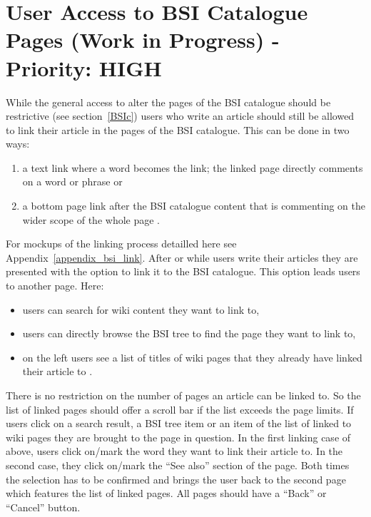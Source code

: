 \section{User Access to BSI Catalogue Pages (Work in Progress) - Priority: HIGH}
\label{2nd_bsi_link}
While the general access to alter the pages of the BSI catalogue should be restrictive (see section~\ref{BSIc}) users who write an article should still be allowed to link their article in the pages of the BSI catalogue.
This can be done in two ways:
\begin{enumerate}
    \item a text link where a word becomes the link; the linked page directly comments on a word or phrase or
    \item a bottom page link after the BSI catalogue content that is commenting on the wider scope of the whole page
        .
\end{enumerate}
\begin{tcolorbox}[breakable,colback=red!12,colframe=red!40!black,title=UPDATE 15/11/2017]
    For mockups of the linking process detailled here see Appendix~\ref{appendix_bsi_link}.
    After or while users write their articles they are presented with the option to link it to the BSI catalogue.
    This option leads users to another page. Here:
    \begin{itemize}
            \begin{comment}
        \item on their first visit, users are presented with 
            \end{comment}
        \item users can search for wiki content they want to link to,
        \item users can directly browse the BSI tree to find the page they want to link to,
        \item on the left users see a list of titles of wiki pages that they already have linked their article to
            .
    \end{itemize}
    There is no restriction on the number of pages an article can be linked to.
    So the list of linked pages should offer a scroll bar if the list exceeds the page limits.
    If users click on a search result, a BSI tree item or an item of the list of linked to wiki pages they are brought to the page in question.
    In the first linking case of above, users click on/mark the word they want to link their article to.
    In the second case, they click on/mark the ``See also'' section of the page.
    Both times the selection has to be confirmed and brings the user back to the second page which features the list of linked pages.
    All pages should have a ``Back'' or ``Cancel'' button.  
\end{tcolorbox}

